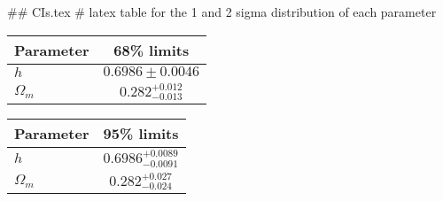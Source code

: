 ## CIs.tex
# latex table for the 1 and 2 sigma distribution of each parameter

\begin{tabular} { l  c}
 Parameter &  68\% limits\\
\hline
{\boldmath$h              $} & $0.6986\pm 0.0046          $\\
{\boldmath$\Omega_m       $} & $0.282^{+0.012}_{-0.013}   $\\
\hline
\end{tabular}

\begin{tabular} { l  c}
 Parameter &  95\% limits\\
\hline
{\boldmath$h              $} & $0.6986^{+0.0089}_{-0.0091}$\\
{\boldmath$\Omega_m       $} & $0.282^{+0.027}_{-0.024}   $\\
\hline
\end{tabular}
